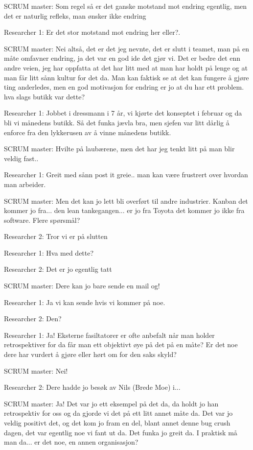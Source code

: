 \documentclass[12pt, a4paper]{report}
\begin{document}
SCRUM master: Som regel så er det ganske motstand mot endring egentlig, men det er naturlig refleks, man ønsker ikke endring 

Researcher 1: Er det stor motstand mot endring her eller?. 

SCRUM master: Nei altså, det er det jeg nevnte, det er slutt i teamet, man på en måte omfavner endring, ja det var en god ide det gjør vi. Det er bedre det enn andre veien, jeg har oppfatta at det har litt med at man har holdt på lenge og at man får litt sånn kultur for det da. Man kan faktisk se at det kan fungere å gjøre ting anderledes, men en god motivasjon for endring er jo at du har ett problem. hva slags butikk var dette?

Researcher 1: Jobbet i dressmann i 7 år, vi kjørte det konseptet i februar og da bli vi månedens butikk. Så det funka jævla bra, men sjefen var litt dårlig å enforce fra den lykkerusen av å vinne månedens butikk.

SCRUM master: Hvilte på laubærene, men det har jeg tenkt litt på man blir veldig fast..

Researcher 1: Greit med sånn post it greie.. man kan være frustrert over hvordan man arbeider.

SCRUM master: Men det kan jo lett bli overført til andre industrier. Kanban det kommer jo fra... den lean tankegangen... er jo fra Toyota det kommer jo ikke fra software. Flere spørsmål?

Researcher 2: Tror vi er på slutten

Researcher 1: Hva med dette?

Researcher 2: Det er jo egentlig tatt

SCRUM master: Dere kan jo bare sende en mail og!

Researcher 1: Ja vi kan sende hvis vi kommer på noe.

Researcher 2: Den?

Researcher 1: Ja! Eksterne fasiltatorer er ofte anbefalt når man holder retrospektiver for da får man ett objektivt øye på det på en måte? Er det noe dere har vurdert å gjøre eller hørt om for den saks skyld? 

SCRUM master: Nei!

Researcher 2: Dere hadde jo besøk av Nils (Brede Moe) i...

SCRUM master: Ja! Det var jo ett eksempel på det da, da holdt jo han retrospektiv for oss og da gjorde vi det på ett litt annet måte da. Det var jo veldig positivt det, og det kom jo fram en del, blant annet denne bug crush dagen, det var egentlig noe vi fant ut da. Det funka jo greit da. I praktisk må man da... er det noe, en annen organisasjon?
\end{document}
